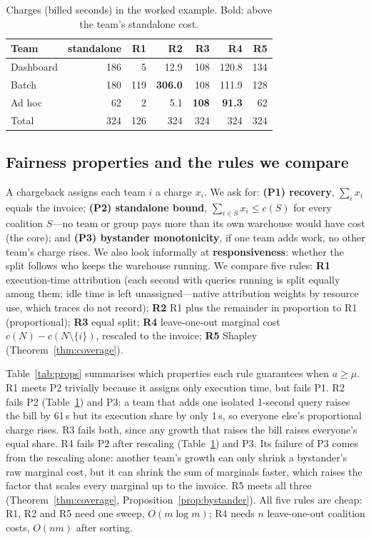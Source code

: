 \documentclass[sigconf]{acmart}
\begin{document}
\begin{table}[t]
\caption{Charges (billed seconds) in the worked example. Bold: above the team's standalone cost.}\label{tab:example}
\small
\begin{tabular}{lrrrrrr}
\toprule
Team & standalone & R1 & R2 & R3 & R4 & R5 \\
\midrule
Dashboard & 186 & 5   & 12.9 & 108 & 120.8 & 134 \\
Batch     & 180 & 119 & \textbf{306.0} & 108 & 111.9 & 128 \\
Ad hoc    & 62  & 2   & 5.1  & \textbf{108} & \textbf{91.3} & 62 \\
\midrule
Total     & 324 & 126 & 324 & 324 & 324 & 324 \\
\bottomrule
\end{tabular}
\end{table}

\subsection{Fairness properties and the rules we compare}\label{sec:rules}
A chargeback assigns each team $i$ a charge $x_i$. We ask for:
\textbf{(P1) recovery}, $\sum_i x_i$ equals the invoice;
\textbf{(P2) standalone bound}, $\sum_{i \in S} x_i \le c(S)$ for every coalition $S$---no team or group pays more than its
own warehouse would have cost (the core); and
\textbf{(P3) bystander monotonicity}, if one team adds work, no other team's charge rises.
We also look informally at \textbf{responsiveness}: whether the split follows who keeps the warehouse running.
We compare five rules:
\textbf{R1} execution-time attribution (each second with queries running is split equally among them; idle time is left
unassigned---native attribution weights by resource use, which traces do not record);
\textbf{R2} R1 plus the remainder in proportion to R1 (proportional);
\textbf{R3} equal split;
\textbf{R4} leave-one-out marginal cost $c(N) - c(N\setminus\{i\})$, rescaled to the invoice;
\textbf{R5} Shapley (Theorem~\ref{thm:coverage}).

Table~\ref{tab:props} summarises which properties each rule guarantees when $a \ge \mu$. R1 meets P2 trivially because it
assigns only execution time, but fails P1. R2 fails P2 (Table~\ref{tab:example}) and P3: a team that adds one isolated
1-second query raises the bill by 61\,s but its execution share by only 1\,s, so everyone else's proportional charge rises.
R3 fails both, since any growth that raises the bill raises everyone's equal share. R4 fails P2 after rescaling (Table~\ref{tab:example}) and P3. Its
failure of P3 comes from the rescaling alone: another team's growth can only shrink a bystander's raw marginal cost, but it can
shrink the sum of marginals faster, which raises the factor that scales every marginal up to the invoice. R5 meets all three
(Theorem~\ref{thm:coverage}, Proposition~\ref{prop:bystander}). All five rules are cheap: R1, R2 and R5 need one sweep,
$O(m \log m)$; R4 needs $n$ leave-one-out coalition costs, $O(nm)$ after sorting.
\end{document}
